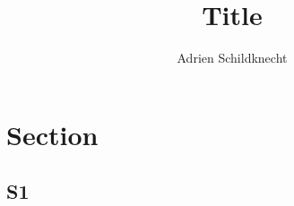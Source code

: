 \documentclass[handout]{beamer}
\title{Title}
\author{Adrien Schildknecht}
\institute{EPITA}
\begin{document}
\begin{frame}
    \titlepage
\end{frame}

\section{Section}
\subsection{S1}
\begin{frame}[fragile]
    \begin{semiverbatim}
    \end{semiverbatim}
\end{frame}
\end{document}
